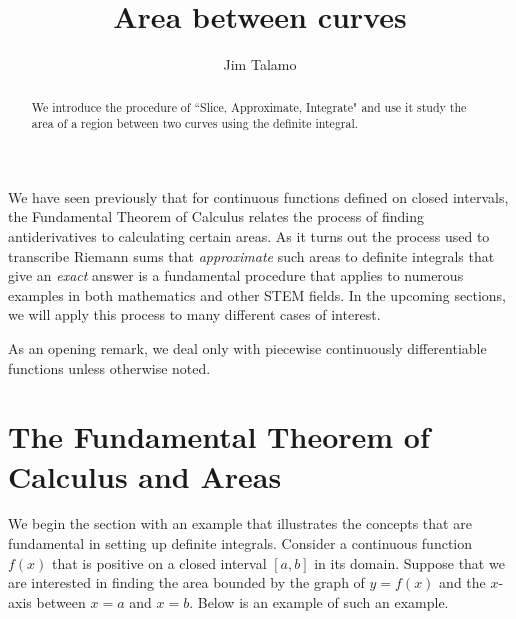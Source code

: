 \documentclass{ximera}
\author{Jim Talamo}
\title[Dig-In:]{Area between curves}
\begin{document}
\begin{abstract}
  We introduce the procedure of ``Slice, Approximate, Integrate" and use it study the area of a region between two curves using the definite integral.
\end{abstract}
\maketitle

We have seen previously that for continuous functions defined on closed intervals, the Fundamental Theorem of Calculus relates the process of finding antiderivatives to calculating certain areas.  As it turns out the process used to transcribe Riemann sums that \emph{approximate} such areas to definite integrals that give an \emph{exact} answer is a fundamental procedure that applies to numerous examples in both mathematics and other STEM fields.  In the upcoming sections, we will apply this process to many different cases of interest. 

As an opening remark, we deal only with piecewise continuously differentiable functions unless otherwise noted.  

\section{The Fundamental Theorem of Calculus and Areas}

We begin the section with an example that illustrates the concepts that are fundamental in setting up definite integrals.  Consider a continuous function $f(x)$ that is positive on a closed interval $[a,b]$ in its domain.   Suppose that we are interested in finding the area bounded by the graph of $y=f(x)$ and the $x$-axis between $x=a$ and $x=b$.  Below is an example of such an example.


\begin{image}
\end{image}
\end{document}
